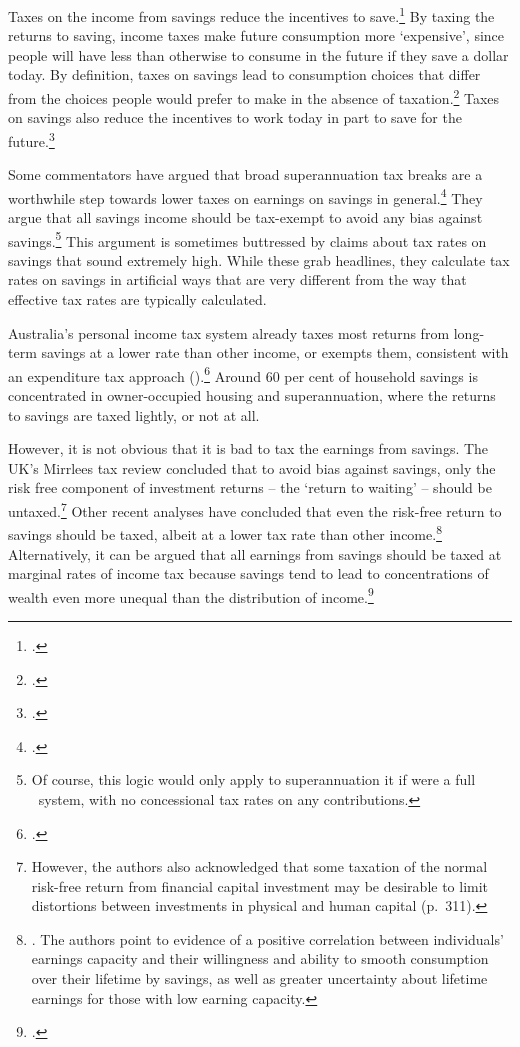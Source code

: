 Taxes on the income from savings reduce the incentives to save.\footcites[][32]{HenryTaxReview2010}[][58]{Treasury2015BudgetPapers201516}[][295]{MirrleesAdamBesleyEtAl2011}  By taxing the returns to saving, income taxes make future consumption more ‘expensive’, since people will have less than otherwise to consume in the future if they save a dollar today. By definition, taxes on savings lead to consumption choices that differ from the choices people would prefer to make in the absence of taxation.\footcite[][295]{MirrleesAdamBesleyEtAl2011} Taxes on savings also reduce the incentives to work today in part to save for the future.\footcite[][12]{HenryTaxReview2010}  


Some commentators have argued that broad superannuation tax breaks are a worthwhile step towards lower taxes on earnings on savings in general.\footcite{CarlingCowanErgas2015}  They argue that all savings income should be tax-exempt to avoid any bias against savings.\footnote{Of course, this logic would only apply to superannuation it if were a full \TEE\ system, with no concessional tax rates on any contributions.} This argument is sometimes buttressed by claims about tax rates on savings that sound extremely high. While these grab headlines, they calculate tax rates on savings in artificial ways that are very different from the way that effective tax rates are typically calculated.  

Australia’s personal income tax system already taxes most returns from long-term savings at a lower rate than other income, or exempts them, consistent with an expenditure tax approach ().\footcite[][12]{HenryTaxReview2010}  Around 60 per cent of household savings is concentrated in owner-occupied housing and superannuation, where the returns to savings are taxed lightly, or not at all. 

However, it is not obvious that it is bad to tax the earnings from savings. The UK’s Mirrlees tax review concluded that to avoid bias against savings, only the risk free component of investment returns – the ‘return to waiting’ – should be untaxed.\footnote{\textcite[][284]{MirrleesAdamBesleyEtAl2011} However, the authors also acknowledged that some taxation of the normal risk-free return from financial capital investment may be desirable to limit distortions between investments in physical and human capital (p.~311).} 
Other recent analyses have concluded that even the risk-free return to savings should be taxed, albeit at a lower tax rate than other income.\footnote{\textcite{BanksDiamond2010}. The authors point to evidence of a positive correlation between individuals’ earnings capacity and their willingness and ability to smooth consumption over their lifetime by savings, as well as greater uncertainty about lifetime earnings for those with low earning capacity.}  Alternatively, it can be argued that all earnings from savings should be taxed at marginal rates of income tax because savings tend to lead to concentrations of wealth even more unequal than the distribution of income.\footcites{Leigh2013}{Piketty2013}[][23]{Ingles2015}

